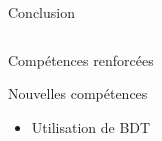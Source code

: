 \documentclass[9pt]{beamer}
\begin{document}
\begin{frame}{Conclusion}
\begin{columns}
\begin{column}{0.45\textwidth}
\begin{block}{Compétences renforcées}
\begin{itemize}
			\end{itemize}
		\end{block}
        
        \begin{exampleblock}{Nouvelles compétences}
			\begin{itemize}
		 		\item Utilisation de BDT
			\end{itemize}
		\end{exampleblock}
        
	\end{column}

\end{columns}

\end{frame}
\end{document}
